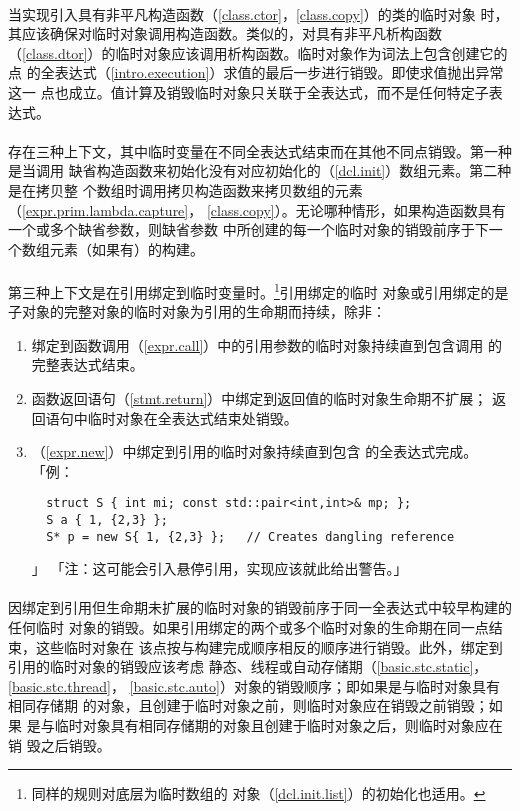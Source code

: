 \paragraph{}
当实现引入具有非平凡构造函数（\ref{class.ctor}，\ref{class.copy}）的类的临时对象
时，其应该确保对临时对象调用构造函数。类似的，对具有非平凡析构函数
（\ref{class.dtor}）的临时对象应该调用析构函数。临时对象作为词法上包含创建它的点
的全表达式（\ref{intro.execution}）求值的最后一步进行销毁。即使求值抛出异常这一
点也成立。值计算及销毁临时对象只关联于全表达式，而不是任何特定子表达式。

\paragraph{}
存在三种上下文，其中临时变量在不同全表达式结束而在其他不同点销毁。第一种是当调用
缺省构造函数来初始化没有对应初始化的（\ref{dcl.init}）数组元素。第二种是在拷贝整
个数组时调用拷贝构造函数来拷贝数组的元素（\ref{expr.prim.lambda.capture}，
\ref{class.copy}）。无论哪种情形，如果构造函数具有一个或多个缺省参数，则缺省参数
中所创建的每一个临时对象的销毁前序于下一个数组元素（如果有）的构建。

\paragraph{}
第三种上下文是在引用绑定到临时变量时。\footnote{同样的规则对底层为临时数组的
对象（\ref{dcl.init.list}）的初始化也适用。}引用绑定的临时
对象或引用绑定的是子对象的完整对象的临时对象为引用的生命期而持续，除非：
\begin{enumerate}
  \item{绑定到函数调用（\ref{expr.call}）中的引用参数的临时对象持续直到包含调用
    的完整表达式结束。}
  \item{函数返回语句（\ref{stmt.return}）中绑定到返回值的临时对象生命期不扩展；
    返回语句中临时对象在全表达式结束处销毁。}
  \item{（\ref{expr.new}）中绑定到引用的临时对象持续直到包含
    的全表达式完成。「例：
\begin{lstlisting}
  struct S { int mi; const std::pair<int,int>& mp; };
  S a { 1, {2,3} };
  S* p = new S{ 1, {2,3} };   // Creates dangling reference
\end{lstlisting}」
「注：这可能会引入悬停引用，实现应该就此给出警告。」}
\end{enumerate}

\paragraph{}
因绑定到引用但生命期未扩展的临时对象的销毁前序于同一全表达式中较早构建的任何临时
对象的销毁。如果引用绑定的两个或多个临时对象的生命期在同一点结束，这些临时对象在
该点按与构建完成顺序相反的顺序进行销毁。此外，绑定到引用的临时对象的销毁应该考虑
静态、线程或自动存储期（\ref{basic.stc.static}，\ref{basic.stc.thread}，
\ref{basic.stc.auto}）对象的销毁顺序；即如果是与临时对象具有相同存储期
的对象，且创建于临时对象之前，则临时对象应在销毁之前销毁；如果
是与临时对象具有相同存储期的对象且创建于临时对象之后，则临时对象应在销
毁之后销毁。

